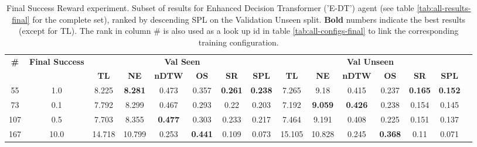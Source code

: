 \begin{table}
\centering
\caption{\label{tab:e_dt_reward_scale}Final Success Reward experiment. Subset of results for Enhanced Decision Transformer ('E-DT') agent (see table \ref{tab:all-results-final} for the complete set), ranked by descending SPL on the Validation Unseen split. \textbf{Bold} numbers indicate the best results (except for TL). The rank in column \# is also used as a look up id in table \ref{tab:all-configs-final} to link the corresponding training configuration.}
\begin{tabular}{@{\hskip3pt}c@{\hskip3pt}c@{\hskip3pt}c@{\hskip3pt}c@{\hskip3pt}c@{\hskip3pt}c@{\hskip3pt}c@{\hskip3pt}c@{\hskip3pt}c@{\hskip3pt}c@{\hskip3pt}c@{\hskip3pt}c@{\hskip3pt}c@{\hskip3pt}c@{\hskip3pt}c}
\toprule
                                  \textbf{\#} & \textbf{Final Success} & \multicolumn{6}{c}{\textbf{Val Seen}} & \multicolumn{6}{c}{\textbf{Val Unseen}} \\
\cmidrule(l){3-8}\cmidrule(l){9-14}\textbf{~} &             \textbf{~} &       \textbf{TL} &     \textbf{NE} &   \textbf{nDTW} &     \textbf{OS} &     \textbf{SR} &    \textbf{SPL} &         \textbf{TL} &     \textbf{NE} &   \textbf{nDTW} &     \textbf{OS} &     \textbf{SR} &    \textbf{SPL} \\
\midrule
                                           55 &                    1.0 &             8.225 &  \textbf{8.281} &           0.473 &           0.357 &  \textbf{0.261} &  \textbf{0.238} &               7.265 &            9.18 &           0.415 &           0.237 &  \textbf{0.165} &  \textbf{0.152} \\
                                           73 &                    0.1 &             7.792 &           8.299 &           0.467 &           0.293 &            0.22 &           0.203 &               7.192 &  \textbf{9.059} &  \textbf{0.426} &           0.238 &           0.154 &           0.145 \\
                                          107 &                    0.5 &             7.703 &           8.355 &  \textbf{0.477} &           0.303 &           0.233 &           0.217 &               7.464 &           9.191 &           0.408 &           0.225 &           0.151 &           0.137 \\
                                          167 &                   10.0 &            14.718 &          10.799 &           0.253 &  \textbf{0.441} &           0.109 &           0.073 &              15.105 &          10.828 &           0.245 &  \textbf{0.368} &            0.11 &           0.071 \\
\bottomrule
\end{tabular}
\end{table}
